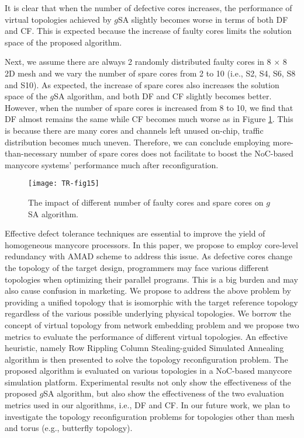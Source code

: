 It is clear that when the number of defective cores increases, the performance of virtual topologies achieved by $g$SA slightly becomes worse in terms of both DF and CF. This is expected because the increase of faulty cores limits the solution space of the proposed algorithm.

Next, we assume there are always 2 randomly distributed faulty cores in 8 $\times$ 8 2D mesh and we vary the number of spare cores from 2 to 10 (i.e., S2, S4, S6, S8 and S10). As expected, the increase of spare cores also increases the solution space of the $g$SA algorithm, and both DF and CF slightly becomes better. However, when the number of spare cores is increased from 8 to 10, we find that DF almost remains the same while CF becomes much worse as in Figure \ref{fig15}. This is because there are many cores and channels left unused on-chip, traffic distribution becomes much uneven. Therefore, we can conclude employing more-than-necessary number of spare cores does not facilitate to boost the NoC-based manycore systems’ performance much after reconfiguration.

\begin{figure}[h]
      \centering
        \texttt{[image: TR-fig15]}
        \caption{ The impact of different number of faulty cores and spare cores on $g$SA algorithm.}
        \label{fig15}
\end{figure}


Effective defect tolerance techniques are essential to improve the yield of homogeneous manycore processors. In this paper, we propose to employ core-level redundancy with AMAD scheme to address this issue. As defective cores change the topology of the target design, programmers may face various different topologies when optimizing their parallel programs. This is a big burden and may also cause confusion in marketing. We propose to address the above problem by providing a unified topology that is isomorphic with the target reference topology regardless of the various possible underlying physical topologies. We borrow the concept of virtual topology from network embedding problem and we propose two metrics to evaluate the performance of different virtual topologies. An effective heuristic, namely Row Rippling Column Stealing-guided Simulated Annealing algorithm is then presented to solve the topology reconfiguration problem. The proposed algorithm is evaluated on various topologies in a NoC-based manycore simulation platform. Experimental results not only show the effectiveness of the proposed $g$SA algorithm, but also show the effectiveness of the two evaluation metrics used in our algorithms, i.e., DF and CF. In our future work, we plan to investigate the topology reconfiguration problems for topologies other than mesh and torus (e.g., butterfly topology).

